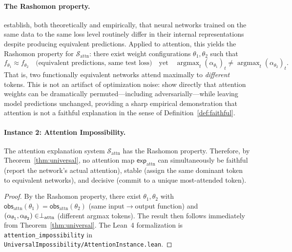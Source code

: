 \paragraph{The Rashomon property.}
\citet{damour2022underspecification} establish, both theoretically and
empirically, that neural networks trained on the same data to the same loss
level routinely differ in their internal representations despite producing
equivalent predictions.  Applied to attention, this yields the Rashomon
property for $\mathcal{S}_{\mathrm{attn}}$: there exist weight configurations
$\theta_1, \theta_2$ such that
\[
  f_{\theta_1} \approx f_{\theta_2}
  \quad\text{(equivalent predictions, same test loss)}
  \quad\text{yet}\quad
  \operatorname{argmax}_t (\alpha_{\theta_1})_t \neq
  \operatorname{argmax}_t (\alpha_{\theta_2})_t.
\]
That is, two functionally equivalent networks attend maximally to
\emph{different} tokens.  This is not an artifact of optimization noise:
\citet{jainwallace2019} show directly that attention weights can be
dramatically permuted---including adversarially---while leaving model
predictions unchanged, providing a sharp empirical demonstration that
attention is not a faithful explanation in the sense of
Definition~\ref{def:faithful}.

\paragraph{Instance 2: Attention Impossibility.}

\begin{theorem}
\label{thm:attention}
The attention explanation system $\mathcal{S}_{\mathrm{attn}}$ has the
Rashomon property.  Therefore, by Theorem~\ref{thm:universal}, no attention
map $\mathsf{exp}_{\mathrm{attn}}$ can simultaneously be faithful (report the
network's actual attention), stable (assign the same dominant token to
equivalent networks), and decisive (commit to a unique most-attended token).
\end{theorem}

\begin{proof}
By the Rashomon property, there exist $\theta_1, \theta_2$ with
$\mathsf{obs}_{\mathrm{attn}}(\theta_1) = \mathsf{obs}_{\mathrm{attn}}(\theta_2)$
(same input$\to$output function) and
$(\alpha_{\theta_1}, \alpha_{\theta_2}) \in \perp_{\mathrm{attn}}$
(different argmax tokens).  The result then follows immediately from
Theorem~\ref{thm:universal}.  The Lean~4 formalization is
\texttt{attention\_impossibility} in
\texttt{UniversalImpossibility/AttentionInstance.lean}.
\end{proof}

